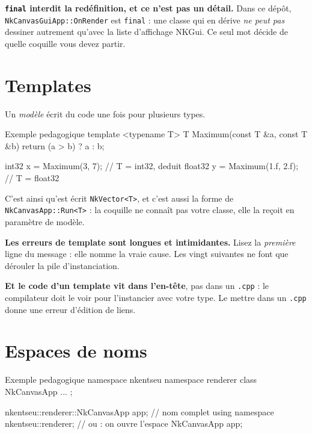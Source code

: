 \begin{nkpiege}
\textbf{\texttt{final} interdit la redéfinition, et ce n'est pas un détail.} Dans
ce dépôt, \texttt{NkCanvasGuiApp::OnRender} est \texttt{final} : une classe qui
en dérive \emph{ne peut pas} dessiner autrement qu'avec la liste d'affichage
NKGui. Ce seul mot décide de quelle coquille vous devez partir.
\end{nkpiege}

\section{Templates}

Un \emph{modèle} écrit du code une fois pour plusieurs types.

\begin{nkcode}{Exemple pedagogique}
template <typename T>
T Maximum(const T &a, const T &b) { return (a > b) ? a : b; }

int32 x = Maximum(3, 7);          // T = int32, deduit
float32 y = Maximum(1.f, 2.f);    // T = float32
\end{nkcode}

C'est ainsi qu'est écrit \texttt{NkVector<T>}, et c'est aussi la forme de
\texttt{NkCanvasApp::Run<T>} : la coquille ne connaît pas votre classe, elle
la reçoit en paramètre de modèle.

\begin{nkpiege}
\textbf{Les erreurs de template sont longues et intimidantes.} Lisez la
\emph{première} ligne du message : elle nomme la vraie cause. Les vingt suivantes
ne font que dérouler la pile d'instanciation.

\textbf{Et le code d'un template vit dans l'en-tête}, pas dans un \texttt{.cpp} :
le compilateur doit le voir pour l'instancier avec votre type. Le mettre dans un
\texttt{.cpp} donne une erreur d'édition de liens.
\end{nkpiege}

\section{Espaces de noms}

\begin{nkcode}{Exemple pedagogique}
namespace nkentseu {
    namespace renderer {
        class NkCanvasApp { ... };
    }
}

nkentseu::renderer::NkCanvasApp app;   // nom complet
using namespace nkentseu::renderer;    // ou : on ouvre l'espace
NkCanvasApp app;
\end{nkcode}

